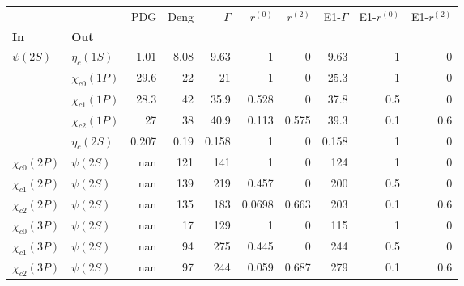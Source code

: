\begin{tabular}{l|l|r|r|r|r|r|r|r|r}
\toprule
                &            &   PDG &  Deng &  $\Gamma$ &  $r^{(0)}$ &  $r^{(2)}$ &  E1-$\Gamma$ &  E1-$r^{(0)}$ &  E1-$r^{(2)}$ \\
\textbf{In} & \textbf{Out} &       &       &           &            &            &              &               &               \\
\midrule
\textbf{$\psi(2S)$} & \textbf{$\eta_{c}(1S)$} &  1.01 &  8.08 &      9.63 &          1 &          0 &         9.63 &             1 &             0 \\
                & \textbf{$\chi_{c0}(1P)$} &  29.6 &    22 &        21 &          1 &          0 &         25.3 &             1 &             0 \\
                & \textbf{$\chi_{c1}(1P)$} &  28.3 &    42 &      35.9 &      0.528 &          0 &         37.8 &           0.5 &             0 \\
                & \textbf{$\chi_{c2}(1P)$} &    27 &    38 &      40.9 &      0.113 &      0.575 &         39.3 &           0.1 &           0.6 \\
                & \textbf{$\eta_{c}(2S)$} & 0.207 &  0.19 &     0.158 &          1 &          0 &        0.158 &             1 &             0 \\
\textbf{$\chi_{c0}(2P)$} & \textbf{$\psi(2S)$} &   nan &   121 &       141 &          1 &          0 &          124 &             1 &             0 \\
\textbf{$\chi_{c1}(2P)$} & \textbf{$\psi(2S)$} &   nan &   139 &       219 &      0.457 &          0 &          200 &           0.5 &             0 \\
\textbf{$\chi_{c2}(2P)$} & \textbf{$\psi(2S)$} &   nan &   135 &       183 &     0.0698 &      0.663 &          203 &           0.1 &           0.6 \\
\textbf{$\chi_{c0}(3P)$} & \textbf{$\psi(2S)$} &   nan &    17 &       129 &          1 &          0 &          115 &             1 &             0 \\
\textbf{$\chi_{c1}(3P)$} & \textbf{$\psi(2S)$} &   nan &    94 &       275 &      0.445 &          0 &          244 &           0.5 &             0 \\
\textbf{$\chi_{c2}(3P)$} & \textbf{$\psi(2S)$} &   nan &    97 &       244 &      0.059 &      0.687 &          279 &           0.1 &           0.6 \\
\bottomrule
\end{tabular}
